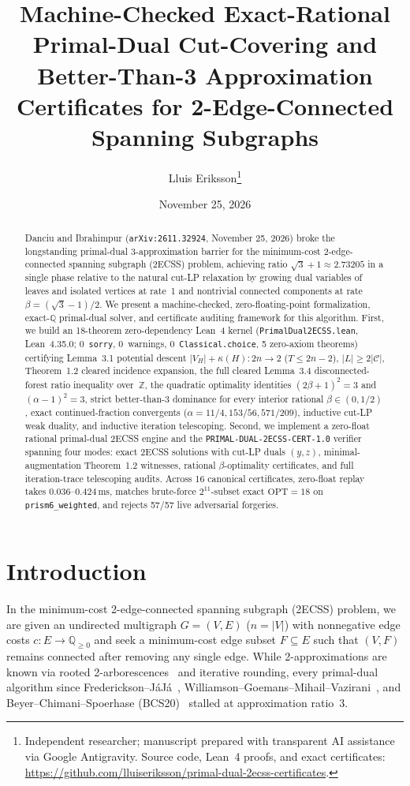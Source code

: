 \documentclass[11pt,twocolumn]{article}
\title{\textbf{Machine-Checked Exact-Rational Primal-Dual Cut-Covering and Better-Than-3 Approximation Certificates for 2-Edge-Connected Spanning Subgraphs}}
\author{Lluis Eriksson\thanks{Independent researcher; manuscript prepared with transparent AI assistance via Google Antigravity. Source code, Lean~4 proofs, and exact certificates: \url{https://github.com/lluiseriksson/primal-dual-2ecss-certificates}.}}
\date{November 25, 2026}
\newcommand{\ZZ}{\mathbb{Z}}
\newcommand{\QQ}{\mathbb{Q}}
\begin{document}
\maketitle

\begin{abstract}
Danciu and Ibrahimpur (\texttt{arXiv:2611.32924}, November 25, 2026) broke the longstanding primal-dual 3-approximation barrier for the minimum-cost 2-edge-connected spanning subgraph (2ECSS) problem, achieving ratio $\sqrt{3} + 1 \approx 2.73205$ in a single phase relative to the natural cut-LP relaxation by growing dual variables of leaves and isolated vertices at rate~1 and nontrivial connected components at rate $\beta = (\sqrt{3}-1)/2$. We present a machine-checked, zero-floating-point formalization, exact-$\QQ$ primal-dual solver, and certificate auditing framework for this algorithm. First, we build an 18-theorem zero-dependency Lean~4 kernel (\texttt{PrimalDual2ECSS.lean}, Lean~4.35.0; 0~\texttt{sorry}, 0~warnings, 0~\texttt{Classical.choice}, 5 zero-axiom theorems) certifying Lemma~3.1 potential descent $|V_H| + \kappa(H) : 2n \to 2$ ($T \le 2n - 2$), $|L| \ge 2|\mathcal{C}|$, Theorem~1.2 cleared incidence expansion, the full cleared Lemma~3.4 disconnected-forest ratio inequality over~$\ZZ$, the quadratic optimality identities $(2\beta+1)^2 = 3$ and $(\alpha-1)^2 = 3$, strict better-than-3 dominance for every interior rational $\beta \in (0, 1/2)$, exact continued-fraction convergents ($\alpha = 11/4, 153/56, 571/209$), inductive cut-LP weak duality, and inductive iteration telescoping. Second, we implement a zero-float rational primal-dual 2ECSS engine and the \texttt{PRIMAL-DUAL-2ECSS-CERT-1.0} verifier spanning four modes: exact 2ECSS solutions with cut-LP duals $(y,z)$, minimal-augmentation Theorem~1.2 witnesses, rational $\beta$-optimality certificates, and full iteration-trace telescoping audits. Across 16 canonical certificates, zero-float replay takes $0.036$--$0.424\,\mathrm{ms}$, matches brute-force $2^{11}$-subset exact $\mathrm{OPT} = 18$ on \texttt{prism6\_weighted}, and rejects 57/57 live adversarial forgeries.
\end{abstract}

\section{Introduction}
In the minimum-cost 2-edge-connected spanning subgraph (2ECSS) problem, we are given an undirected multigraph $G = (V, E)$ ($n = |V|$) with nonnegative edge costs $c : E \to \QQ_{\ge 0}$ and seek a minimum-cost edge subset $F \subseteq E$ such that $(V, F)$ remains connected after removing any single edge. While 2-approximations are known via rooted 2-arborescences~\cite{khuller1994biconnectivity} and iterative rounding, every primal-dual algorithm since Frederickson--J\'aJ\'a~\cite{frederickson1981approximation}, Williamson--Goemans--Mihail--Vazirani~\cite{williamson1995primal}, and Beyer--Chimani--Spoerhase (BCS20)~\cite{beyer2020primal} stalled at approximation ratio~$3$.
\end{document}
